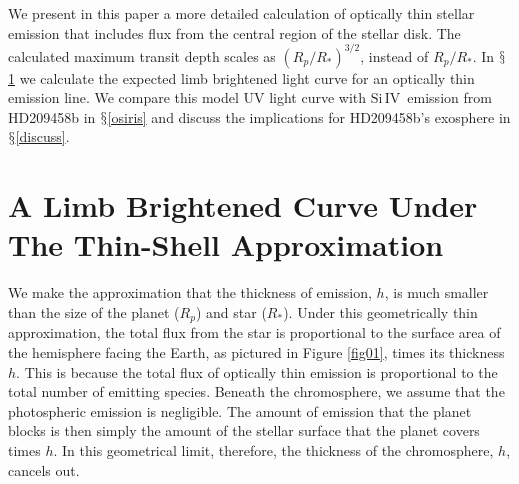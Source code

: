 \documentclass[twocolumn]{emulateapj}
\newcommand{\siIV}{\ensuremath{\mathrm{Si}\,\scriptstyle \mathrm{IV}}}
\begin{document}
We present in this paper a more detailed calculation of optically thin stellar emission that includes flux from the central region of the stellar disk. The calculated maximum transit depth scales as $(R_p/R_*)^{3/2}$, instead of $R_p/R_*$. In
$\mathsection$\ref{labl:chromlcurve} we calculate the expected limb
brightened light curve for an optically thin emission line. We
compare this model UV light curve with \siIV\ emission from HD209458b in  $\mathsection$\ref{osiris} and discuss the implications for HD209458b's exosphere in $\mathsection$\ref{discuss}.

\section{A Limb Brightened Curve Under The Thin-Shell Approximation} \label{labl:chromlcurve}
\label{labl:thinshell}

We make the approximation that the thickness of emission, $h$, is much smaller than the size of the planet ($R_p$) and star ($R_*$). Under this geometrically thin approximation, the total flux from the star is proportional to the surface area of the hemisphere facing the Earth, as pictured in Figure \ref{fig01}, times its thickness $h$. This is because the total flux of optically thin emission is proportional to the total number of emitting species. Beneath the chromosphere, we assume that the photospheric emission is negligible. The amount of emission that the planet blocks is then simply the amount of the stellar surface that the planet covers times $h$. In this geometrical limit, therefore, the thickness of the chromosphere, $h$, cancels out.


\end{document}
